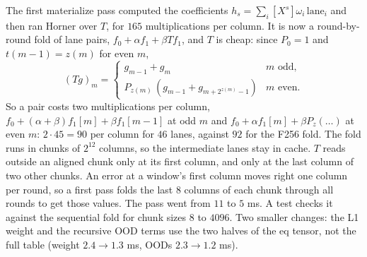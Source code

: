 \documentclass[11pt]{article}
\begin{document}
The first materialize pass computed the coefficients $h_s = \sum_i
[X^s]\omega_i\,\mathrm{lane}_i$ and then ran Horner over $T$, for $165$
multiplications per column. It is now a round-by-round fold of lane
pairs, $f_0 + \alpha f_1 + \beta T f_1$, and $T$ is cheap: since $P_0 =
1$ and $t(m-1) = z(m)$ for even $m$,
\[
  (Tg)_m = \begin{cases} g_{m-1} + g_m & m \text{ odd},\\
  P_{z(m)}\,(g_{m-1} + g_{m+2^{z(m)}-1}) & m \text{ even}. \end{cases}
\]
So a pair costs two multiplications per column, $f_0 + (\alpha+\beta)
f_1[m] + \beta f_1[m-1]$ at odd $m$ and $f_0 + \alpha f_1[m] + \beta
P_z(\dots)$ at even $m$: $2 \cdot 45 = 90$ per column for $46$ lanes,
against $92$ for the F256 fold. The fold runs in chunks of $2^{12}$
columns, so the intermediate lanes stay in cache. $T$ reads outside an
aligned chunk only at its first column, and only at the last column of
two other chunks. An error at a window's first column moves right one
column per round, so a first pass folds the last $8$ columns of each
chunk through all rounds to get those values. The pass went from $11$
to $5$ ms. A test checks it against the sequential fold for chunk sizes
$8$ to $4096$. Two smaller changes: the L1 weight and the recursive OOD
terms use the two halves of the eq tensor, not the full table (weight
$2.4 \to 1.3$ ms, OODs $2.3 \to 1.2$ ms).
\end{document}
